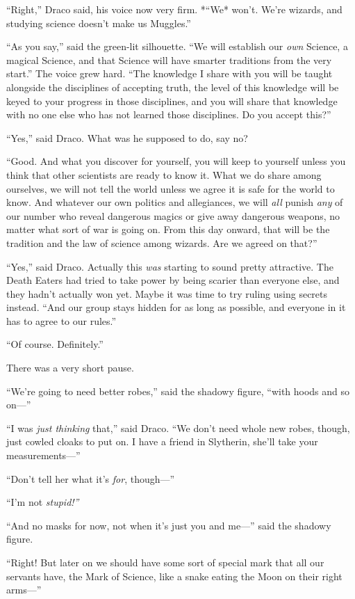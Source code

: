 ``Right,'' Draco said, his voice now very firm. *``We* won't. We're
wizards, and studying science doesn't make us Muggles.''

``As you say,'' said the green-lit silhouette. ``We will establish our
\emph{own} Science, a magical Science, and that Science will have
smarter traditions from the very start.'' The voice grew hard. ``The
knowledge I share with you will be taught alongside the disciplines of
accepting truth, the level of this knowledge will be keyed to your
progress in those disciplines, and you will share that knowledge with no
one else who has not learned those disciplines. Do you accept this?''

``Yes,'' said Draco. What was he supposed to do, say no?

``Good. And what you discover for yourself, you will keep to yourself
unless you think that other scientists are ready to know it. What we do
share among ourselves, we will not tell the world unless we agree it is
safe for the world to know. And whatever our own politics and
allegiances, we will \emph{all} punish \emph{any} of our number who
reveal dangerous magics or give away dangerous weapons, no matter what
sort of war is going on. From this day onward, that will be the
tradition and the law of science among wizards. Are we agreed on that?''

``Yes,'' said Draco. Actually this \emph{was} starting to sound pretty
attractive. The Death Eaters had tried to take power by being scarier
than everyone else, and they hadn't actually won yet. Maybe it was time
to try ruling using secrets instead. ``And our group stays hidden for as
long as possible, and everyone in it has to agree to our rules.''

``Of course. Definitely.''

There was a very short pause.

``We're going to need better robes,'' said the shadowy figure, ``with
hoods and so on---''

``I was \emph{just thinking} that,'' said Draco. ``We don't need whole
new robes, though, just cowled cloaks to put on. I have a friend in
Slytherin, she'll take your measurements---''

``Don't tell her what it's \emph{for}, though---''

``I'm not \emph{stupid!''}

``And no masks for now, not when it's just you and me---'' said the
shadowy figure.

``Right! But later on we should have some sort of special mark that all
our servants have, the Mark of Science, like a snake eating the Moon on
their right arms---''

